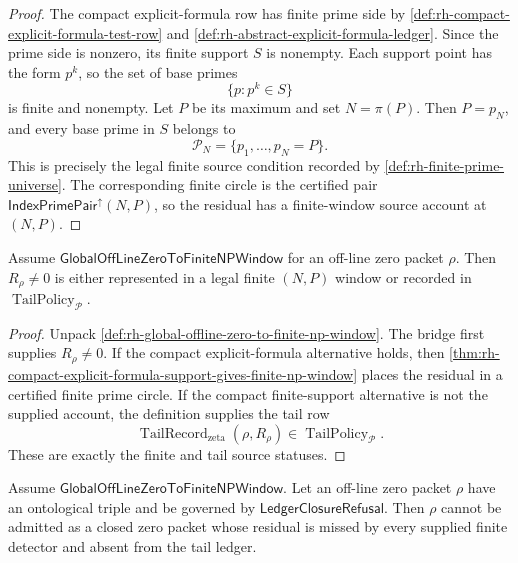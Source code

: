 \begin{proof}
The compact explicit-formula row has finite prime side by
\autoref{def:rh-compact-explicit-formula-test-row} and
\autoref{def:rh-abstract-explicit-formula-ledger}.  Since the prime
side is nonzero, its finite support $S$ is nonempty.  Each support point
has the form $p^k$, so the set of base primes
$$
\{p:p^k\in S\}
$$
is finite and nonempty.  Let $P$ be its maximum and set $N=\pi(P)$.
Then $P=p_N$, and every base prime in $S$ belongs to
$$
\mathcal P_N=\{p_1,\ldots,p_N=P\}.
$$
This is precisely the legal finite source condition recorded by
\autoref{def:rh-finite-prime-universe}.  The corresponding finite
circle is the certified pair
$\mathsf{IndexPrimePair}^{\uparrow}(N,P)$, so the residual has a
finite-window source account at $(N,P)$.
\end{proof}

\begin{theorem}
\label{thm:rh-global-bridge-gives-finite-or-tail-residual-status}
Assume $\mathsf{GlobalOffLineZeroToFiniteNPWindow}$ for an off-line zero
packet $\rho$.  Then $R_\rho\ne0$ is either represented in a legal
finite $(N,P)$ window or recorded in
$\operatorname{TailPolicy}_{\mathcal P}$.
\end{theorem}

\begin{proof}
Unpack
\autoref{def:rh-global-offline-zero-to-finite-np-window}.  The bridge
first supplies $R_\rho\ne0$.  If the compact explicit-formula
alternative holds, then
\autoref{thm:rh-compact-explicit-formula-support-gives-finite-np-window}
places the residual in a certified finite prime circle.  If the compact
finite-support alternative is not the supplied account, the definition
supplies the tail row
$$
\operatorname{TailRecord}_{\mathrm{zeta}}(\rho,R_\rho)
\in
\operatorname{TailPolicy}_{\mathcal P}.
$$
These are exactly the finite and tail source statuses.
\end{proof}

\begin{theorem}
\label{thm:rh-global-window-bridge-excludes-closed-missed-offline-packets}
Assume $\mathsf{GlobalOffLineZeroToFiniteNPWindow}$.  Let an off-line
zero packet $\rho$ have an ontological triple and be governed by
$\mathsf{LedgerClosureRefusal}$.  Then $\rho$ cannot be admitted as a
closed zero packet whose residual is missed by every supplied finite
detector and absent from the tail ledger.
\end{theorem}

